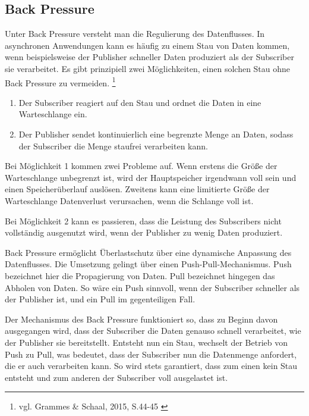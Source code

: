\subsection{Back Pressure}
\label{subsubsec:backpressure}
Unter Back Pressure versteht man die Regulierung des Datenflusses. In asynchronen Anwendungen kann es häufig zu einem Stau von Daten kommen, wenn beispielsweise der Publisher schneller Daten produziert als der Subscriber sie verarbeitet. Es gibt prinzipiell zwei Möglichkeiten, einen solchen Stau ohne Back Pressure zu vermeiden. \footnote{vgl. Grammes \& Schaal, 2015, S.44-45 \cite{web:artikel:javaspektrum} \label{grammesschaal}}
\begin{enumerate}
\item Der Subscriber reagiert auf den Stau und ordnet die Daten in eine Warteschlange ein. 
\item Der Publisher sendet kontinuierlich eine begrenzte Menge an Daten, sodass der Subscriber die Menge staufrei verarbeiten kann. 
\end{enumerate}

Bei Möglichkeit 1 kommen zwei Probleme auf. Wenn erstens die Größe der Warteschlange unbegrenzt ist, wird der Hauptspeicher irgendwann voll sein und einen Speicherüberlauf auslösen. Zweitens kann eine limitierte Größe der Warteschlange Datenverlust verursachen, wenn die Schlange voll ist.  

Bei Möglichkeit 2 kann es passieren, dass die Leistung des Subscribers nicht vollständig ausgenutzt wird, wenn der Publisher zu wenig Daten produziert.  

Back Pressure ermöglicht Überlastschutz über eine dynamische Anpassung des Datenflusses. Die Umsetzung gelingt über einen Push-Pull-Mechanismus. Push bezeichnet hier die Propagierung von Daten. Pull bezeichnet hingegen das Abholen von Daten. So wäre ein Push sinnvoll, wenn der Subscriber schneller als der Publisher ist, und ein Pull im gegenteiligen Fall.  

Der Mechanismus des Back Pressure funktioniert so, dass zu Beginn davon ausgegangen wird, dass der Subscriber die Daten genauso schnell verarbeitet, wie der Publisher sie bereitstellt. Entsteht nun ein Stau, wechselt der Betrieb von Push zu Pull, was bedeutet, dass der Subscriber nun die Datenmenge anfordert, die er auch verarbeiten kann. So wird stets garantiert, dass zum einen kein Stau entsteht und zum anderen der Subscriber voll ausgelastet ist. 


